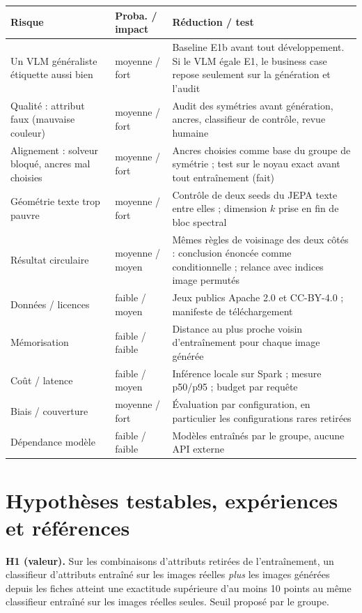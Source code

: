 \documentclass[10pt,a4paper]{article}
\begin{document}
\begin{center}\small
\begin{tabularx}{\textwidth}{@{}P{2.6cm}P{2.3cm}L@{}}
\toprule
Risque & Proba. / impact & Réduction / test \\
\midrule
Un VLM généraliste étiquette aussi bien & moyenne / fort & Baseline E1b avant tout développement. Si le VLM égale E1, le business case repose seulement sur la génération et l'audit \\
Qualité : attribut faux (mauvaise couleur) & moyenne / fort & Audit des symétries avant génération, ancres, classifieur de contrôle, revue humaine \\
Alignement : solveur bloqué, ancres mal choisies & moyenne / fort & Ancres choisies comme base du groupe de symétrie ; test sur le noyau exact avant tout entraînement (fait) \\
Géométrie texte trop pauvre & moyenne / fort & Contrôle de deux seeds du JEPA texte entre elles ; dimension $k$ prise en fin de bloc spectral \\
Résultat circulaire & moyenne / moyen & Mêmes règles de voisinage des deux côtés : conclusion énoncée comme conditionnelle ; relance avec indices image permutés \\
Données / licences & faible / moyen & Jeux publics Apache 2.0 et CC-BY-4.0 ; manifeste de téléchargement \\
Mémorisation & faible / faible & Distance au plus proche voisin d'entraînement pour chaque image générée \\
Coût / latence & faible / moyen & Inférence locale sur Spark ; mesure p50/p95 ; budget par requête \\
Biais / couverture & moyenne / fort & Évaluation par configuration, en particulier les configurations rares retirées \\
Dépendance modèle & faible / faible & Modèles entraînés par le groupe, aucune API externe \\
\bottomrule
\end{tabularx}
\end{center}

\section{Hypothèses testables, expériences et références}

\textbf{H1 (valeur).} Sur les combinaisons d'attributs retirées de l'entraînement, un classifieur d'attributs entraîné sur les images réelles \emph{plus} les images générées depuis les fiches atteint une exactitude supérieure d'au moins 10 points au même classifieur entraîné sur les images réelles seules. Seuil proposé par le groupe.
\end{document}
